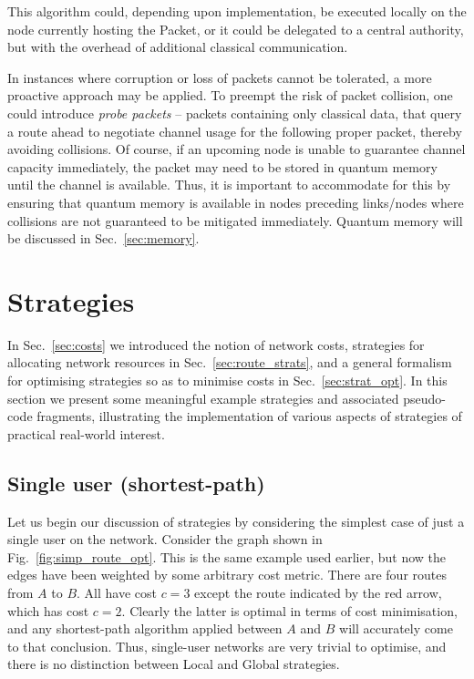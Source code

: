 \documentclass[aps,rmp,twocolumn,amsmath,amssymb,nofootinbib,superscriptaddress]{revtex4}
\begin{document}
This algorithm could, depending upon implementation, be executed locally on the node currently hosting the {\sc Packet}, or it could be delegated to a central authority, but with the overhead of additional classical communication.

In instances where corruption or loss of packets cannot be tolerated, a more proactive approach may be applied. To preempt the risk of packet collision, one could introduce \emph{probe packets} -- packets containing only classical data, that query a route ahead to negotiate channel usage for the following proper packet, thereby avoiding collisions. Of course, if an upcoming node is unable to guarantee channel capacity immediately, the packet may need to be stored in quantum memory until the channel is available. Thus, it is important to accommodate for this by ensuring that quantum memory is available in nodes preceding links/nodes where collisions are not guaranteed to be mitigated immediately. Quantum memory will be discussed in Sec.~\ref{sec:memory}.

%
%

\section{Strategies} \label{sec:strategies}

In Sec.~\ref{sec:costs} we introduced the notion of network costs, strategies for allocating network resources in Sec.~\ref{sec:route_strats}, and a general formalism for optimising strategies so as to minimise costs in Sec.~\ref{sec:strat_opt}. In this section we present some meaningful example strategies and associated pseudo-code fragments, illustrating the implementation of various aspects of strategies of practical real-world interest.

%
%

\subsection{Single user (shortest-path)} \label{sec:single_user_shortest}

Let us begin our discussion of strategies by considering the simplest case of just a single user on the network. Consider the graph shown in Fig.~\ref{fig:simp_route_opt}. This is the same example used earlier, but now the edges have been weighted by some arbitrary cost metric. There are four routes from $A$ to $B$. All have cost \mbox{$c=3$} except the route indicated by the red arrow, which has cost \mbox{$c=2$}. Clearly the latter is optimal in terms of cost minimisation, and any shortest-path algorithm applied between $A$ and $B$ will accurately come to that conclusion. Thus, single-user networks are very trivial to optimise, and there is no distinction between {\sc Local} and {\sc Global} strategies.
\end{document}

